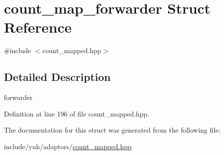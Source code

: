 \hypertarget{structyuh_1_1range__detail_1_1count__map__forwarder}{\section{count\-\_\-map\-\_\-forwarder \-Struct \-Reference}
\label{da/d5c/structyuh_1_1range__detail_1_1count__map__forwarder}
}


{\ttfamily \#include $<$count\-\_\-mapped.\-hpp$>$}



\subsection{\-Detailed \-Description}
forwarder 

\-Definition at line 196 of file count\-\_\-mapped.\-hpp.



\-The documentation for this struct was generated from the following file\-:\begin{DoxyCompactItemize}
\item 
include/yuh/adaptors/\hyperlink{count__mapped_8hpp}{count\-\_\-mapped.\-hpp}\end{DoxyCompactItemize}
